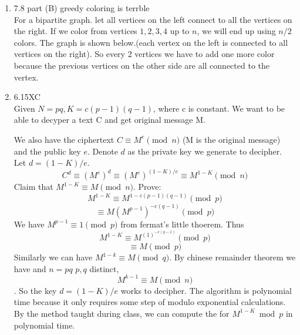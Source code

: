 \documentclass[11pt]{article}
\begin{document}
\begin{enumerate}
\item 7.8 part (B) greedy coloring is terrble\\
For a bipartite graph. let all vertices on the left connect to all the vertices on the right. If we color from vertices $1,2,3,4$ up to $n$, we will end up using $n/2$ colors. The graph is shown below.(each vertex on the left is connected to all vertices on the right). So every 2 vertices we have to add one more color because the previous vertices on the other side are all connected to the vertex. 


\pagebreak

\item 6.15XC\\
Given $N=pq, K = c(p-1)(q-1)$, where c is constant. We want to be able to decyper a text C and get original message M. 

We also have the ciphertext $C \equiv M^e \pmod{n}$ (M is the original message) and the public key $e$.
Denote $d$ as the private key we generate to decipher. Let $d = (1-K)/e$.
\[C^d \equiv (M^e)^d \equiv (M^e)^{(1-K)/e} \equiv M^{1-K} \pmod{n}\]
Claim that $M^{1-K} \equiv M \pmod{n}$.
Prove:
\[M^{1-K} \equiv M^{1-c(p-1)(q-1)} \pmod{p}\]
\[ \equiv M(M^{p-1})^{-c(q-1)} \pmod{p} \]
We have $ M^{p-1} \equiv 1 \pmod{p} $ from fermat's little thoerem.
Thus \[M^{1-K} \equiv M^{(1)^{-c(q-1)}} \pmod{p} \]
\[ \equiv M \pmod{p}\]
Similarly we can have $M^{1-k} \equiv M \pmod{q}$.
By chinese remainder theorem we have and $n=pq$ $p,q$ distinct,
\[M^{k-1} \equiv M \pmod{n}\].
So the key $d=(1-K)/e$ works to decipher. 
The algorithm is polynomial time because it only requires some step of modulo exponential calculations. By the method taught during class, we can compute the for $M^{1-K} \bmod{p}$ in polynomial time.

\end{enumerate}
\end{document}
